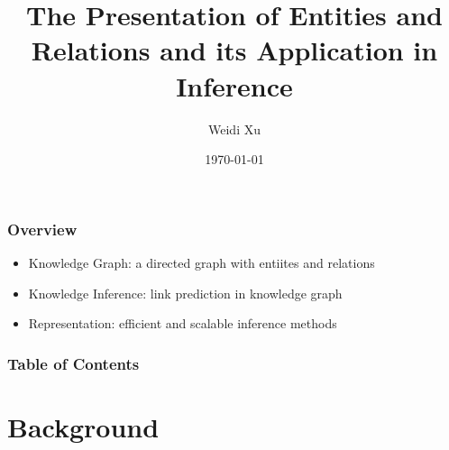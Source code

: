 \documentclass[pdf,10pt]{beamer}
\begin{document}
\title{The Presentation of Entities and Relations and its Application in Inference}
\subtitle{}
\author{Weidi Xu}
\date{\today}
\frame{\titlepage}


\begin{frame}
	\frametitle{Overview}
	\begin{itemize}
		\item Knowledge Graph: a directed graph with entiites and relations
		\item Knowledge Inference: link prediction in knowledge graph
		\item Representation: efficient and scalable inference methods
	\end{itemize}
\end{frame}

\begin{frame}
\frametitle{Table of Contents}
\tableofcontents
\end{frame}



\section{Background}
\end{document}
